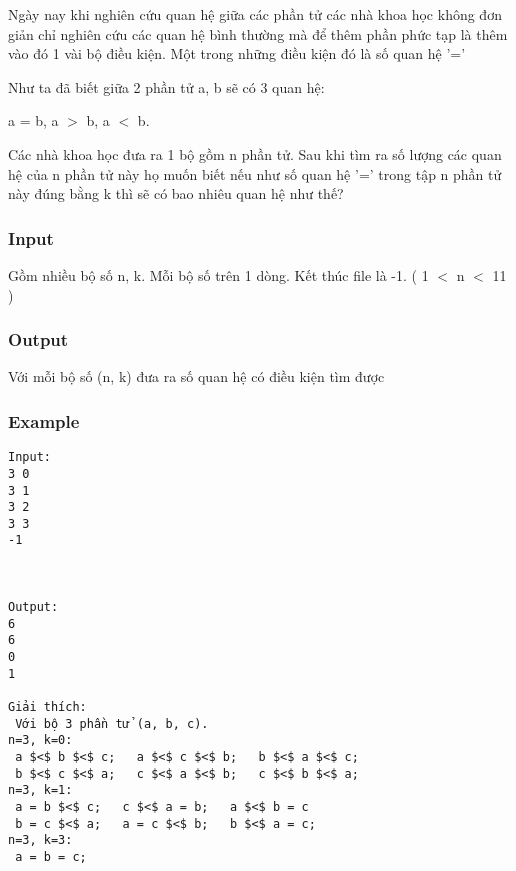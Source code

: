 



   Ngày nay khi nghiên cứu quan hệ giữa các phần tử các nhà khoa học không đơn giản chỉ nghiên cứu các quan hệ bình thường mà để thêm phần phức tạp là thêm vào đó 1 vài bộ điều kiện. Một trong những điều kiện đó là số quan hệ '='  

   Như ta đã biết giữa 2 phần tử a, b sẽ có 3 quan hệ:  

   a = b, a $>$ b, a $<$ b.  

   Các nhà khoa học đưa ra 1 bộ gồm n phần tử. Sau khi tìm ra số lượng các quan hệ của n phần tử này họ muốn biết nếu như số quan hệ '=' trong tập n phần tử này đúng bằng k thì sẽ có bao nhiêu quan hệ như thế?  

\subsubsection{   Input  }

   Gồm nhiều bộ số n, k. Mỗi bộ số trên 1 dòng. Kết thúc file là -1.  ( 1 $<$ n $<$ 11 )  

\subsubsection{   Output  }

   Với mỗi bộ số (n, k) đưa ra số quan hệ có điều kiện tìm được  

\subsubsection{   Example  }
\begin{verbatim}
Input:
3 0
3 1
3 2
3 3
-1



Output:
6
6
0
1

Giải thích:
 Với bộ 3 phần tử (a, b, c). 
n=3, k=0:
 a $<$ b $<$ c;   a $<$ c $<$ b;   b $<$ a $<$ c; 
 b $<$ c $<$ a;   c $<$ a $<$ b;   c $<$ b $<$ a;
n=3, k=1:
 a = b $<$ c;   c $<$ a = b;   a $<$ b = c
 b = c $<$ a;   a = c $<$ b;   b $<$ a = c;
n=3, k=3:
 a = b = c; 

\end{verbatim}